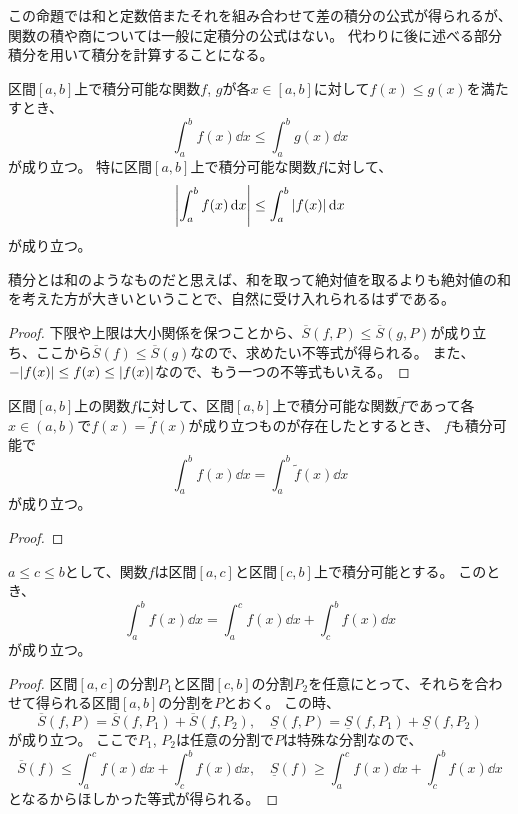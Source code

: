 この命題では和と定数倍またそれを組み合わせて差の積分の公式が得られるが、関数の積や商については一般に定積分の公式はない。
代わりに後に述べる部分積分を用いて積分を計算することになる。

\begin{proposition}[積分の大小関係]
\label{t_int_order}
区間$[a, b]$上で積分可能な関数$f$, $g$が各$x \in [a, b]$に対して$f(x) \le g(x)$を満たすとき、
$$
\int_a^b f(x)\dd{x} \le \int_a^b g(x)\dd{x}
$$
が成り立つ。
特に区間$[a, b]$上で積分可能な関数$f$に対して、
$$
\abs{\int_a^b f(x)\dd{x}} \le \int_a^b \abs{f(x)}\dd{x}
$$
が成り立つ。
\end{proposition}

積分とは和のようなものだと思えば、和を取って絶対値を取るよりも絶対値の和を考えた方が大きいということで、自然に受け入れられるはずである。

\begin{proof}
下限や上限は大小関係を保つことから、$\overline{S}(f, P) \le \overline{S}(g, P)$が成り立ち、ここから$\overline{S}(f) \le \overline{S}(g)$なので、求めたい不等式が得られる。
また、$-\abs{f(x)} \le f(x) \le \abs{f(x)}$なので、もう一つの不等式もいえる。
\end{proof}

\begin{proposition}[積分の端点修正]
区間$[a, b]$上の関数$f$に対して、区間$[a, b]$上で積分可能な関数$\tilde{f}$であって各$x \in (a, b)$で$f(x) = \tilde{f}(x)$が成り立つものが存在したとするとき、
$f$も積分可能で
$$
\int_a^b f(x)\dd{x} = \int_a^b \tilde{f}(x)\dd{x}
$$
が成り立つ。
\end{proposition}

\begin{proof}
\end{proof}

\begin{proposition}[積分の区間]
\label{t_int_interval}
$a \le c \le b$として、関数$f$は区間$[a, c]$と区間$[c, b]$上で積分可能とする。
このとき、
$$
\int_a^b f(x)\dd{x} = \int_a^c f(x)\dd{x}+\int_c^b f(x)\dd{x}
$$
が成り立つ。
\end{proposition}

\begin{proof}
区間$[a, c]$の分割$P_1$と区間$[c, b]$の分割$P_2$を任意にとって、それらを合わせて得られる区間$[a, b]$の分割を$P$とおく。
この時、
$$
\overline{S}(f, P) = \overline{S}(f, P_1)+\overline{S}(f, P_2),
\quad \underline{S}(f, P) = \underline{S}(f, P_1)+\underline{S}(f, P_2)
$$
が成り立つ。
ここで$P_1$, $P_2$は任意の分割で$P$は特殊な分割なので、
$$
\overline{S}(f) \le \int_a^c f(x)\dd{x}+\int_c^b f(x)\dd{x},
\quad \underline{S}(f) \ge \int_a^c f(x)\dd{x}+\int_c^b f(x)\dd{x}
$$
となるからほしかった等式が得られる。
\end{proof}

